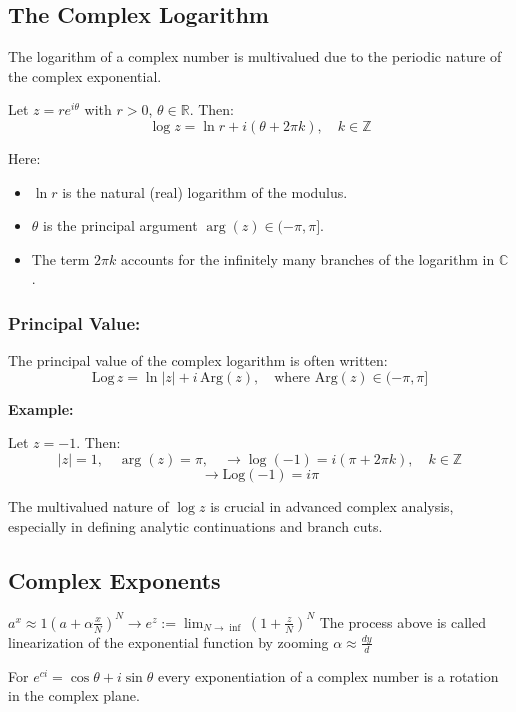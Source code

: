 \subsection{The Complex Logarithm}

The logarithm of a complex number is multivalued due to the periodic nature of the complex exponential.

Let \( z = re^{i\theta} \) with \( r > 0 \), \( \theta \in \mathbb{R} \). Then:
\[
	\log z = \ln r + i(\theta + 2\pi k), \quad k \in \mathbb{Z}
\]

Here:
\begin{itemize}[label=\(-\)]
	\item \( \ln r \) is the natural (real) logarithm of the modulus.
	\item \( \theta \) is the principal argument \( \arg(z) \in (-\pi, \pi] \).
	\item The term \( 2\pi k \) accounts for the infinitely many branches of the logarithm in \( \mathbb{C} \).
\end{itemize}

\subsubsection*{Principal Value:}
The principal value of the complex logarithm is often written:
\[
	\mathrm{Log}\,z = \ln |z| + i\,\mathrm{Arg}(z), \quad \text{where } \mathrm{Arg}(z) \in (-\pi, \pi]
\]

\textbf{Example:}
\vspace{\baselineskip}

Let \( z = -1 \). Then:
\[
	|z| = 1, \quad \arg(z) = \pi, \quad \to \log(-1) = i(\pi + 2\pi k), \quad k \in \mathbb{Z}
\]
\[
	\to \mathrm{Log}(-1) = i\pi
\]

The multivalued nature of \( \log z \) is crucial in advanced complex analysis, especially in defining analytic continuations and branch cuts.

\subsection{Complex Exponents}
\(a^x \approx 1 {\left(a + \alpha \frac{x}{N} \right)}^N \to e^z := \lim_{N \rightarrow \inf} {\left( 1 + \frac{z}{N}\right)}^N \)
The process above is called linearization of the exponential function by zooming  \(\alpha \approx \frac{dy}{d}\)

 For  \(e^{ci} = \cos{\theta} + i\sin{\theta}\) every exponentiation of a complex number is a rotation 
in the complex plane.

